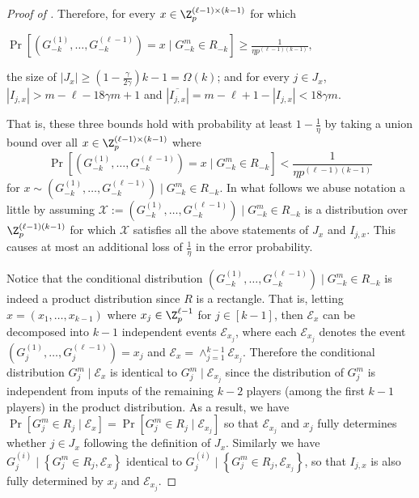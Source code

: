 \documentclass{toc}
\newcommand{\set}[1]{{\left \{{#1} \right \}}}
\newcommand{\cond}{\;|\;}
\newcommand{\Cond}{\;\Big|\;}
\newcommand{\bigomega}[1]{\ensuremath{{\Omega \left( {#1} \right)}}}
\newcommand{\eqdef}{\ensuremath{:=}}
\newcommand{\event}{\ensuremath{\mathcal{E}}}
\begin{document}
\begin{proof}[Proof of ]
		
		Therefore, for every $x\in \Z_p^{(\ell-1)\times(k-1)}$ for which 
		\begin{center}$\Pr\left[\left(G_{-k}^{(1)},\dots,G_{-k}^{(\ell-1)}\right)=x \cond G_{-k}^m\in R_{-k} \right] \ge \frac{1}{\eta  p^{(\ell-1)(k-1)}},$\end{center} 
		the size of $|J_x|\ge \left(1-\frac{\gamma}{2\gamma}\right)k-1=\bigomega{k}$; and for every  $j\in J_x$, 
		$|I_{j,x}|>m-\ell - 18\gamma m + 1$ and $\left|\overline{I_{j,x}}\right|=m-\ell+1 - |I_{j,x}| <18\gamma m$.
		
		That is, these three bounds hold with probability 
		at least $1-\frac{1}{\eta}$ by taking a union bound over all $x \in \Z_p^{(\ell-1)\times(k-1)}$ where
		$$\Pr\left[\left(G_{-k}^{(1)},\dots,G_{-k}^{(\ell-1)}\right)=x \cond G_{-k}^m\in R_{-k} \right] < \frac{1}{\eta  p^{(\ell-1)(k-1)}}$$
		for 
		$x\sim\left(G_{-k}^{(1)},\dots,G_{-k}^{(\ell-1)}\right)\Cond G_{-k}^m\in R_{-k}$.
		In what follows we abuse notation a little by assuming $\mathcal{X}\eqdef \left(G_{-k}^{(1)},\dots,G_{-k}^{(\ell-1)}\right)\Cond G_{-k}^m\in R_{-k}$ is a distribution over $\Z_p^{(\ell-1)(k-1)}$ for which $\mathcal{X}$ satisfies all the above statements of $J_x$ and $I_{j,x}$.
		This causes at most an additional loss of $\frac{1}{\eta}$ in the error probability.


		Notice that 
		the conditional distribution $\left(G_{-k}^{(1)},\dots,G_{-k}^{(\ell-1)}\right)\Cond G_{-k}^m\in R_{-k}$ is indeed a product distribution since $R$ is a rectangle.
		That is, letting $x=(x_1,\dots, x_{k-1})$ where $x_j\in \Z_p^{\ell-1}$ for $j\in [k-1]$,
		then $\event_x$ can be decomposed into $k-1$ independent events $\event_{x_j}$, 
		where each $\event_{x_j}$ denotes the event $\left(G_{j}^{(1)},\dots,G_{j}^{(\ell-1)}\right)=x_j$ and $\event_x=\wedge_{j=1}^{k-1}\event_{x_j}$. 
		Therefore the conditional distribution
		$G^m_j \; \big| \; \event_x$ is identical to $G_j^m \Cond  \event_{x_j}$ since the distribution of $G^m_j$ is independent from inputs of the remaining $k-2$ players (among the first $k-1$ players) in the product distribution. 
		As a result, we have
		$\Pr\left[G^m_j\in R_j\; \big| \; \event_x\right] = \Pr\left[ G_j^m\in R_j \Cond  \event_{x_j} \right]$
		so that $\event_{x_j}$ and $x_j$ fully determines whether $j\in J_x$ following the definition of $J_x$.
		Similarly we have $G_j^{(i)}\Cond \set{G_j^m\in R_j,\event_x}$ identical to $G_j^{(i)}\Cond \set{G_j^m\in R_j,\event_{x_j}}$, 
		so that $I_{j,x}$ is also fully determined by $x_j$ and $\event_{x_j}$.


\end{proof}
\end{document}
